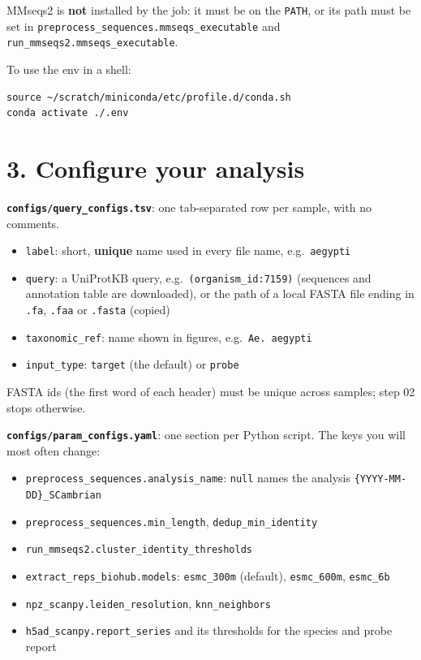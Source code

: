 \documentclass[
  10pt,
]{article}
\providecommand{\tightlist}{%
  \setlength{\itemsep}{0pt}\setlength{\parskip}{0pt}}
\begin{document}
MMseqs2 is \textbf{not} installed by the job: it must be on the \texttt{PATH}, or its path must be set in \texttt{preprocess\_sequences.mmseqs\_executable} and \texttt{run\_mmseqs2.mmseqs\_executable}.

To use the env in a shell:

\begin{verbatim}
source ~/scratch/miniconda/etc/profile.d/conda.sh
conda activate ./.env
\end{verbatim}

\section{3. Configure your analysis}

\textbf{\texttt{configs/query\_configs.tsv}}: one tab-separated row per sample, with no comments.

\begin{itemize}
\tightlist
\item \texttt{label}: short, \textbf{unique} name used in every file name, e.g.~\texttt{aegypti}
\item \texttt{query}: a UniProtKB query, e.g.~\texttt{(organism\_id:7159)} (sequences and annotation table are downloaded), or the path of a local FASTA file ending in \texttt{.fa}, \texttt{.faa} or \texttt{.fasta} (copied)
\item \texttt{taxonomic\_ref}: name shown in figures, e.g.~\texttt{Ae.\ aegypti}
\item \texttt{input\_type}: \texttt{target} (the default) or \texttt{probe}
\end{itemize}

FASTA ids (the first word of each header) must be unique across samples; step 02 stops otherwise.

\textbf{\texttt{configs/param\_configs.yaml}}: one section per Python script. The keys you will most often change:

\begin{itemize}
\tightlist
\item \texttt{preprocess\_sequences.analysis\_name}: \texttt{null} names the analysis \texttt{\{YYYY-MM-DD\}\_SCambrian}
\item \texttt{preprocess\_sequences.min\_length}, \texttt{dedup\_min\_identity}
\item \texttt{run\_mmseqs2.cluster\_identity\_thresholds}
\item \texttt{extract\_reps\_biohub.models}: \texttt{esmc\_300m} (default), \texttt{esmc\_600m}, \texttt{esmc\_6b}
\item \texttt{npz\_scanpy.leiden\_resolution}, \texttt{knn\_neighbors}
\item \texttt{h5ad\_scanpy.report\_series} and its thresholds for the species and probe report
\end{itemize}
\end{document}
